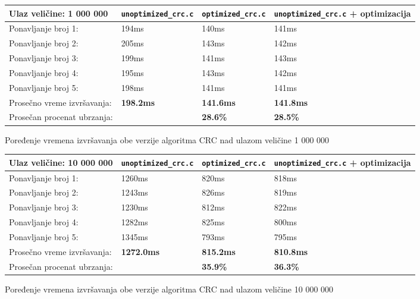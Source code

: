 \documentclass[12pt,oneside]{memoir}
\begin{document}
\begin{figure}[!ht]
\begin{center}
\begin{tabular}{ | m{5.5cm} | m{2.5cm}| m{2.5cm} | m{2.5cm} |  }
      \hline
     Ulaz veličine: 1 000 000 & \texttt{unoptimized}\-\texttt{\_crc.c} & \texttt{optimized}\-\texttt{\_crc.c} & \texttt{unoptimized}\-\texttt{\_crc.c} + optimizacija\\ 
      \hline
      Ponavljanje broj 1: & 194ms & 140ms & 141ms\\
      \hline
      Ponavljanje broj 2: & 205ms & 143ms & 142ms\\
      \hline
      Ponavljanje broj 3: & 199ms & 141ms &  143ms\\
      \hline
      Ponavljanje broj 4: & 195ms & 143ms & 142ms\\
      \hline
      Ponavljanje broj 5: & 198ms & 141ms & 141ms\\
      \hline
      Prosečno vreme izvršavanja: & \textbf{198.2ms} & \textbf{141.6ms} & \textbf{141.8ms}\\
      \hline
      Prosečan procenat ubrzanja: & & \textbf{28.6\%} & \textbf{28.5\%} \\
      \hline
\end{tabular}
\end{center}
\caption{Poređenje vremena izvršavanja obe verzije algoritma CRC nad ulazom veličine 1 000 000}
\label{table_1m}
\end{figure}

\begin{figure}[!ht]
\begin{center}
\begin{tabular}{| m{5.5cm} | m{2.5cm}| m{2.5cm} | m{2.5cm} | }
      \hline
     Ulaz veličine: 10 000 000 & \texttt{unoptimized}\-\texttt{\_crc.c} & \texttt{optimized}\-\texttt{\_crc.c} & \texttt{unoptimized}\-\texttt{\_crc.c} + optimizacija\\ 
      \hline
      Ponavljanje broj 1: & 1260ms & 820ms & 818ms\\
      \hline
      Ponavljanje broj 2: & 1243ms & 826ms & 819ms\\
      \hline
      Ponavljanje broj 3: & 1230ms & 812ms & 822ms\\
      \hline
      Ponavljanje broj 4: & 1282ms & 825ms & 800ms\\
      \hline
      Ponavljanje broj 5: & 1345ms & 793ms & 795ms\\
      \hline
      Prosečno vreme izvršavanja: & \textbf{1272.0ms} & \textbf{815.2ms} & \textbf{810.8ms} \\
      \hline
      Prosečan procenat ubrzanja: & & \textbf{35.9\%} & \textbf{36.3\%}\\
      \hline
\end{tabular}
\end{center}
\caption{Poređenje vremena izvršavanja obe verzije algoritma CRC nad ulazom veličine 10 000 000}
\label{table_10m}
\end{figure}
\end{document}
